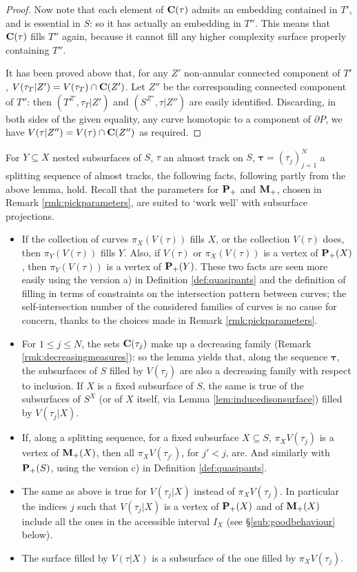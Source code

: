 \begin{proof}
Now note that each element of $\mathbf C(\tau)$ admits an embedding contained in $T'$, and is essential in $S$: so it has actually an embedding in $T''$. This means that $\mathbf C(\tau)$ fills $T''$ again, because it cannot fill any higher complexity surface properly containing $T''$.

It has been proved above that, for any $Z'$ non-annular connected component of $T'$, $V(\tau_T|Z')=V(\tau_T)\cap \mathbf C(Z')$. Let $Z''$ be the corresponding connected component of $T''$: then $(T^{Z'},\tau_T|Z')$ and $(S^{Z''},\tau|Z'')$ are easily identified. Discarding, in both sides of the given equality, any curve homotopic to a component of $\partial P$, we have $V(\tau|Z'')=V(\tau)\cap \mathbf C(Z'')$ as required.
\end{proof}

\begin{rmk}
For $Y\subseteq X$ nested subsurfaces of $S$, $\tau$ an almost track on $S$, $\bm\tau=(\tau_j)_{j=1}^N$ a splitting sequence of almost tracks, the following facts, following partly from the above lemma, hold. Recall that the parameters for ${\mathbf{P}_+}$ and ${\mathbf{M}_+}$, chosen in Remark \ref{rmk:pickparameters}, are suited to `work well' with subsurface projections.

\begin{itemize}
\item If the collection of curves $\pi_X\left(V(\tau)\right)$ fills $X$, or the collection $V(\tau)$ does, then $\pi_Y\left(V(\tau)\right)$ fills $Y$. Also, if $V(\tau)$ or $\pi_X\left(V(\tau)\right)$ is a vertex of ${\mathbf{P}_+}(X)$, then $\pi_Y\left(V(\tau)\right)$ is a vertex of ${\mathbf{P}_+}(Y)$. These two facts are seen more easily using the version a) in Definition \ref{def:quasipants} and the definition of filling in terms of constraints on the intersection pattern between curves; the self-intersection number of the considered families of curves is no cause for concern, thanks to the choices made in Remark \ref{rmk:pickparameters}.
\item For $1\leq j\leq N$, the sets $\mathbf C(\tau_j)$ make up a decreasing family (Remark \ref{rmk:decreasingmeasures}): so the lemma yields that, along the sequence $\bm\tau$, the subsurfaces of $S$ filled by $V(\tau_j)$ are also a decreasing family with respect to inclusion. If $X$ is a fixed subsurface of $S$, the same is true of the subsurfaces of $S^X$ (or of $X$ itself, via Lemma \ref{lem:inducedisonsurface}) filled by $V(\tau_j|X)$.
\item If, along a splitting sequence, for a fixed subsurface $X\subseteq S$, $\pi_X V(\tau_j)$ is a vertex of ${\mathbf{M}_+}(X)$, then all $\pi_X V(\tau_{j'})$, for $j'<j$, are. And similarly with ${\mathbf{P}_+}(S)$, using the version c) in Definition \ref{def:quasipants}.
\item The same as above is true for $V(\tau_j|X)$ instead of $\pi_X V(\tau_j)$. In particular the indices $j$ such that $V(\tau_j|X)$ is a vertex of ${\mathbf{P}_+}(X)$ and of ${\mathbf{M}_+}(X)$ include all the ones in the accessible interval $I_X$ (see \S \ref{sub:goodbehaviour} below).
\item The surface filled by $V(\tau|X)$ is a subsurface of the one filled by $\pi_X V(\tau_j)$.
\end{itemize}
\end{rmk}

